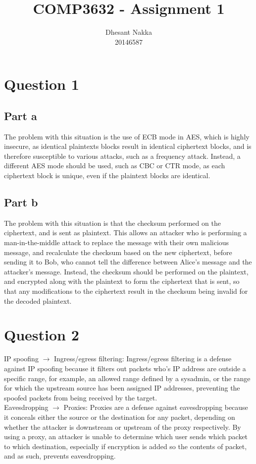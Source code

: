 \documentclass[12pt,a4paper]{article}
\title{COMP3632 - Assignment 1}
\author{Dhesant Nakka\\20146587}
\begin{document}
\maketitle

\section{Question 1}
\subsection{Part a}
The problem with this situation is the use of ECB mode in AES, which is highly insecure, as identical plaintexts blocks result in identical ciphertext blocks, and is therefore susceptible to various attacks, such as a frequency attack. Instead, a different AES mode should be used, such as CBC or CTR mode, as each ciphertext block is unique, even if the plaintext blocks are identical.

\subsection{Part b}
The problem with this situation is that the checksum performed on the ciphertext, and is sent as plaintext. This allows an attacker who is performing a man-in-the-middle attack to replace the message with their own malicious message, and recalculate the checksum based on the new ciphertext, before sending it to Bob, who cannot tell the difference between Alice's message and the attacker's message. Instead, the checksum should be performed on the plaintext, and encrypted along with the plaintext to form the ciphertext that is sent, so that any modifications to the ciphertext result in the checksum being invalid for the decoded plaintext.


\section{Question 2}
IP spoofing \(\rightarrow\) Ingress/egress filtering: Ingress/egress filtering is a defense against IP spoofing because it filters out packets who's IP address are outside a specific range, for example, an allowed range defined by a sysadmin, or the range for which the upstream source has been assigned IP addresses, preventing the spoofed packets from being received by the target.\\

Eavesdropping \(\rightarrow\) Proxies: Proxies are a defense against eavesdropping because it conceals either the source or the destination for any packet, depending on whether the attacker is downstream or upstream of the proxy respectively. By using a proxy, an attacker is unable to determine which user sends which packet to which destination, especially if encryption is added so the contents of packet, and as such, prevents eavesdropping.\\
\end{document}
